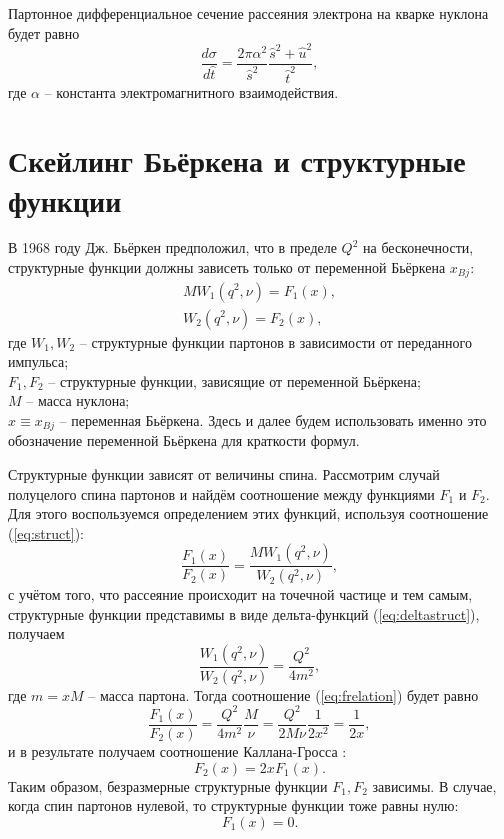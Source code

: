 \documentclass{extreport}
\begin{document}
Партонное дифференциальное сечение рассеяния электрона на кварке нуклона будет равно
\begin{equation}
	\label{eq:parsigma}
	\frac{d\sigma}{d\hat{t}} = \frac{2\pi \alpha^2}{\hat{s}^2} \frac{\hat{s}^2 + \hat{u}^2}{\hat{t}^2},
\end{equation}
где $\alpha$ -- константа электромагнитного взаимодействия. 

\section{Скейлинг Бьёркена и структурные функции}

В 1968 году Дж. Бьёркен предположил, что в пределе $Q^2$ на бесконечности, структурные функции должны зависеть только от переменной Бьёркена $x_{Bj}$:
\begin{equation}
	\begin{split}
	MW_1(q^2, \nu) = F_1 (x) ,\\
	W_2(q^2, \nu) = F_2(x),
	\end{split}
	\label{eq:struct}
\end{equation}
где  $W_1, W_2$ -- структурные функции партонов в зависимости от переданного импульса; \\ $F_1, F_2$ -- структурные функции, зависящие от переменной Бьёркена; \\ $M$ -- масса нуклона; \\ $x \equiv x_{Bj}$ -- переменная Бьёркена. Здесь и далее будем использовать именно это обозначение переменной Бьёркена для краткости формул.

Структурные функции зависят от величины спина. Рассмотрим случай полуцелого спина партонов и найдём соотношение между функциями $F_1$ и $F_2$. Для этого воспользуемся определением этих функций, используя соотношение (\ref{eq:struct}):
\begin{equation}
	\frac{F_1(x)}{F_2(x)} = \frac{MW_1(q^2, \nu)}{W_2(q^2, \nu)},
	\label{eq:frelation}
\end{equation}
с учётом того, что рассеяние происходит на точечной частице и тем самым, структурные функции представимы в виде дельта-функций (\ref{eq:deltastruct}), получаем
\begin{equation}
	\frac{W_1(q^2, \nu)}{W_2(q^2, \nu)} = \frac{Q^2}{4m^2},
\end{equation}
где $m = xM$ -- масса партона. Тогда соотношение (\ref{eq:frelation}) будет равно
\begin{equation}
	\frac{F_1(x)}{F_2(x)} =  \frac{Q^2}{4m^2} \frac{M}{\nu} =  \frac{Q^2}{2M\nu} \frac{1}{2x^2} = \frac{1}{2x},
\end{equation}
и в результате получаем соотношение Каллана-Гросса \cite{Callan-Gross}:
\begin{equation}
		F_2(x) = 2xF_1(x).
\end{equation}
Таким образом, безразмерные структурные функции $F_1, F_2$ зависимы. В случае, когда спин партонов нулевой, то структурные функции тоже равны нулю:
\begin{equation}
	F_1 (x) = 0.
\end{equation}
\end{document}
